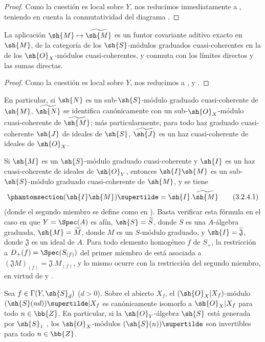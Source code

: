 \documentclass[oneside,10pt]{amsart}
\makeatletter
\newcommand{\ega@arrow}[2]{\mathchoice{#1}{#2}{#2}{#2}}
\let\ega@shortmapsto\mapsto
\renewcommand{\mapsto}{\ega@arrow{\longmapsto}{\ega@shortmapsto}}
\newcommand{\oldpage}[2][]{\marginnote{\normalfont\footnotesize\textbf{#1}~|~#2}\ignorespaces}
\let\EGAOriginalLabel\label
\renewcommand{\label}[1]{\phantomsection\EGAOriginalLabel{#1}}
\makeatother
\begin{document}
\begin{proof}
Como la cuestión es local sobre $Y$, nos reducimos inmediatamente a , teniendo en cuenta la conmutatividad del diagrama .
\end{proof}

\begin{proposition}[3.2.4]
\label{II.3.2.4}
La aplicación $\sh{M}\mapsto\widetilde{\sh{M}}$ es un funtor covariante aditivo exacto en $\sh{M}$, de la categoría de los $\sh{S}$-módulos graduados cuasi-coherentes en la de los $\sh{O}_X$-módulos cuasi-coherentes, y conmuta con los límites directos y las sumas directas.
\end{proposition}

\begin{proof}
Como la cuestión es local sobre $Y$, nos reducimos a ,  y .
\end{proof}

En particular, si $\sh{N}$ es un sub-$\sh{S}$-módulo graduado cuasi-coherente de $\sh{M}$, $\widetilde{\sh{N}}$ se identifica canónicamente con un sub-$\sh{O}_X$-módulo cuasi-coherente de $\widetilde{\sh{M}}$; más particularmente, para todo haz graduado cuasi-coherente $\sh{J}$ de ideales de $\sh{S}$, $\widetilde{\sh{J}}$ es un haz cuasi-coherente de ideales de $\sh{O}_X$.

Si $\sh{M}$ es un $\sh{S}$-módulo graduado cuasi-coherente y $\sh{I}$ es un haz cuasi-coherente de ideales de $\sh{O}_Y$, entonces $\sh{I}\sh{M}$ es un sub-$\sh{S}$-módulo graduado cuasi-coherente de $\sh{M}$, y se tiene
\[
\label{II.3.2.4.1}
  (\sh{I}\sh{M})\supertilde=\sh{I}.\widetilde{\sh{M}}
\tag{3.2.4.1}
\]
(donde el segundo miembro se define como en ).
Basta verificar esta fórmula en el caso en que $Y=\Spec(A)$ es afín, $\sh{S}=\widetilde{S}$, donde $S$ es una $A$-álgebra graduada, $\sh{M}=\widetilde{M}$, donde $M$ es un $S$-módulo graduado, y $\sh{I}=\widetilde{\mathfrak{J}}$, donde $\mathfrak{J}$ es un ideal de $A$.
\oldpage[II]{55}
Para todo elemento homogéneo $f$ de $S_+$, la restricción a $D_+(f)=\Spec(S_{(f)})$ del primer miembro de  está asociada a $(\mathfrak{J}M)_{(f)}=\mathfrak{J}.M_{(f)}$, y lo mismo ocurre con la restricción del segundo miembro, en virtud de  y .

\begin{proposition}[3.2.5]
\label{II.3.2.5}
Sea $f\in\Gamma(Y,\sh{S}_d)$ ($d>0$).
Sobre el abierto $X_f$, el $(\sh{O}_X|X_f)$-módulo $(\sh{S}(nd))\supertilde|X_f$ es canónicamente isomorfo a $\sh{O}_X|X_f$ para todo $n\in\bb{Z}$.
En particular, si la $\sh{O}_Y$-álgebra $\sh{S}$ está generada por $\sh{S}_1$ , los $\sh{O}_X$-módulos $(\sh{S}(n))\supertilde$ son invertibles para todo $n\in\bb{Z}$.
\end{proposition}
\end{document}
